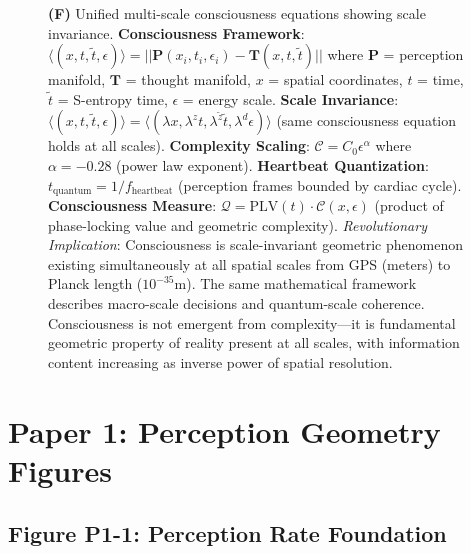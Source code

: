 \documentclass[11pt]{article}
\begin{document}
\begin{figure}[H]
{\textbf{(F)} Unified multi-scale consciousness equations showing scale invariance. \textbf{Consciousness Framework}: $\langle(x,t,\tilde{t},\epsilon)\rangle = ||\mathbf{P}(x_i,t_i,\epsilon_i) - \mathbf{T}(x,t,\tilde{t})||$ where $\mathbf{P}$ = perception manifold, $\mathbf{T}$ = thought manifold, $x$ = spatial coordinates, $t$ = time, $\tilde{t}$ = S-entropy time, $\epsilon$ = energy scale. \textbf{Scale Invariance}: $\langle(x,t,\tilde{t},\epsilon)\rangle = \langle(\lambda x, \lambda^z t, \lambda^{\tilde{z}}\tilde{t}, \lambda^d\epsilon)\rangle$ (same consciousness equation holds at all scales). \textbf{Complexity Scaling}: $\mathcal{C} = C_0 \epsilon^{\alpha}$ where $\alpha = -0.28$ (power law exponent). \textbf{Heartbeat Quantization}: $t_{\text{quantum}} = 1/f_{\text{heartbeat}}$ (perception frames bounded by cardiac cycle). \textbf{Consciousness Measure}: $\mathcal{Q} = \text{PLV}(t) \cdot \mathcal{C}(x,\epsilon)$ (product of phase-locking value and geometric complexity).
\textit{Revolutionary Implication}: Consciousness is scale-invariant geometric phenomenon existing simultaneously at all spatial scales from GPS (meters) to Planck length ($10^{-35}$m). The same mathematical framework describes macro-scale decisions and quantum-scale coherence. Consciousness is not emergent from complexity---it is fundamental geometric property of reality present at all scales, with information content increasing as inverse power of spatial resolution.}
\label{fig:master_multiscale}
\end{figure}

\clearpage

\section{Paper 1: Perception Geometry Figures}

\subsection{Figure P1-1: Perception Rate Foundation}
\end{document}

